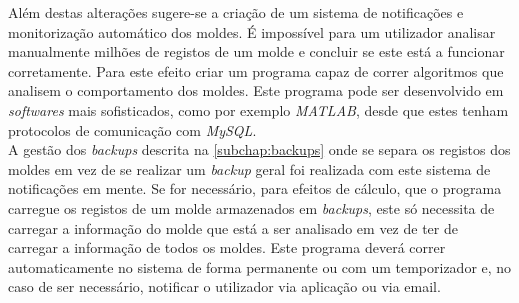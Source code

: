 \documentclass[11pt,twoside,a4paper]{report}
\begin{document}
Além destas alterações sugere-se a criação de um sistema de notificações e monitorização automático dos moldes. É impossível para um utilizador analisar manualmente milhões de registos de um molde e concluir se este está a funcionar corretamente. Para este efeito criar um programa capaz de correr algoritmos que analisem o comportamento dos moldes. Este programa pode ser desenvolvido em \textit{softwares} mais sofisticados, como por exemplo \textit{MATLAB}, desde que estes tenham protocolos de comunicação com \textit{MySQL}.\\
A gestão dos \textit{backups} descrita na \autoref{subchap:backups} onde se separa os registos dos moldes em vez de se realizar um \textit{backup} geral foi realizada com este sistema de notificações em mente. Se for necessário, para efeitos de cálculo, que o programa carregue os registos de um molde armazenados em \textit{backups}, este só necessita de carregar a informação do molde que está a ser analisado em vez de ter de carregar a informação de todos os moldes. Este programa deverá correr automaticamente no sistema de forma permanente ou com um temporizador e, no caso de ser necessário, notificar o utilizador via aplicação ou via email.

%
%
\cleardoublepage



%  
%
%
\cleardoublepage
\end{document}
